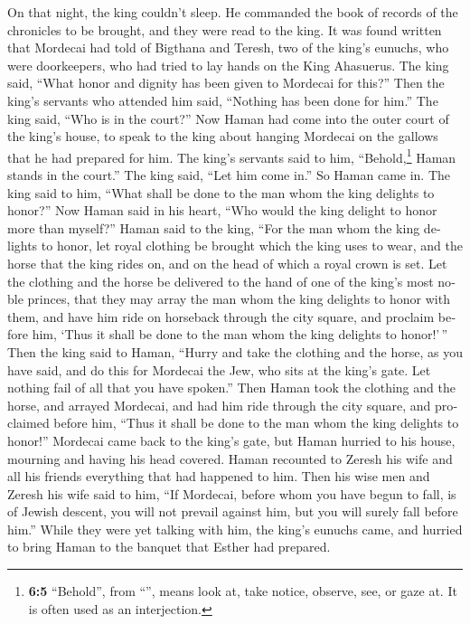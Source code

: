 \begin{paracol}{2}
\begin{otherlanguage}{english}
 On that night, the king couldn't sleep. He commanded the
book of records of the chronicles to be brought, and they were read to
the king.  It was found written that Mordecai had told of
Bigthana and Teresh, two of the king's eunuchs, who were doorkeepers,
who had tried to lay hands on the King Ahasuerus.  The
king said, ``What honor and dignity has been given to Mordecai for
this?'' Then the king's servants who attended him said, ``Nothing has
been done for him.''  The king said, ``Who is in the
court?'' Now Haman had come into the outer court of the king's house, to
speak to the king about hanging Mordecai on the gallows that he had
prepared for him.  The king's servants said to him,
``Behold,\footnote{\textbf{6:5} ``Behold'', from ``'', means
  look at, take notice, observe, see, or gaze at. It is often used as an
  interjection.} Haman stands in the court.'' The king said, ``Let him
come in.''  So Haman came in. The king said to him, ``What
shall be done to the man whom the king delights to honor?'' Now Haman
said in his heart, ``Who would the king delight to honor more than
myself?''  Haman said to the king, ``For the man whom the
king delights to honor,  let royal clothing be brought
which the king uses to wear, and the horse that the king rides on, and
on the head of which a royal crown is set.  Let the
clothing and the horse be delivered to the hand of one of the king's
most noble princes, that they may array the man whom the king delights
to honor with them, and have him ride on horseback through the city
square, and proclaim before him, `Thus it shall be done to the man whom
the king delights to honor!'\,''  Then the king said to
Haman, ``Hurry and take the clothing and the horse, as you have said,
and do this for Mordecai the Jew, who sits at the king's gate. Let
nothing fail of all that you have spoken.''  Then Haman
took the clothing and the horse, and arrayed Mordecai, and had him ride
through the city square, and proclaimed before him, ``Thus it shall be
done to the man whom the king delights to honor!'' 
Mordecai came back to the king's gate, but Haman hurried to his house,
mourning and having his head covered.  Haman recounted to
Zeresh his wife and all his friends everything that had happened to him.
Then his wise men and Zeresh his wife said to him, ``If Mordecai, before
whom you have begun to fall, is of Jewish descent, you will not prevail
against him, but you will surely fall before him.'' 
While they were yet talking with him, the king's eunuchs came, and
hurried to bring Haman to the banquet that Esther had prepared.


\end{otherlanguage}
\end{paracol}
